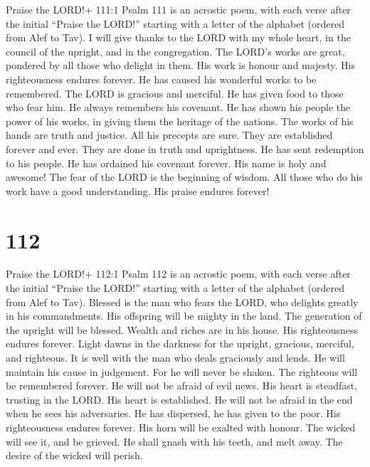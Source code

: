  Praise the LORD!+ 111:1 Psalm 111 is an acrostic poem, with
each verse after the initial ``Praise the LORD!'' starting with a letter
of the alphabet (ordered from Alef to Tav). I will give thanks to the
LORD with my whole heart, in the council of the upright, and in the
congregation.  The LORD's works are great, pondered by all
those who delight in them.  His work is honour and majesty.
His righteousness endures forever.  He has caused his
wonderful works to be remembered. The LORD is gracious and merciful.
 He has given food to those who fear him. He always
remembers his covenant.  He has shown his people the power
of his works, in giving them the heritage of the nations. 
The works of his hands are truth and justice. All his precepts are sure.
 They are established forever and ever. They are done in
truth and uprightness.  He has sent redemption to his
people. He has ordained his covenant forever. His name is holy and
awesome!  The fear of the LORD is the beginning of wisdom.
All those who do his work have a good understanding. His praise endures
forever!

\hypertarget{section-102}{%
\section{112}\label{section-102}}

 Praise the LORD!+ 112:1 Psalm 112 is an acrostic poem, with
each verse after the initial ``Praise the LORD!'' starting with a letter
of the alphabet (ordered from Alef to Tav). Blessed is the man who fears
the LORD, who delights greatly in his commandments.  His
offspring will be mighty in the land. The generation of the upright will
be blessed.  Wealth and riches are in his house. His
righteousness endures forever.  Light dawns in the darkness
for the upright, gracious, merciful, and righteous.  It is
well with the man who deals graciously and lends. He will maintain his
cause in judgement.  For he will never be shaken. The
righteous will be remembered forever.  He will not be afraid
of evil news. His heart is steadfast, trusting in the LORD. 
His heart is established. He will not be afraid in the end when he sees
his adversaries.  He has dispersed, he has given to the
poor. His righteousness endures forever. His horn will be exalted with
honour.  The wicked will see it, and be grieved. He shall
gnash with his teeth, and melt away. The desire of the wicked will
perish.

